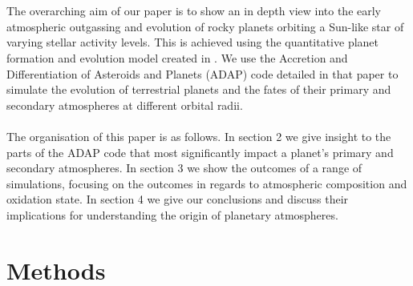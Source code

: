 \documentclass[bibyear,tradiabstract]{aa}
\begin{document}
\\
\\
The overarching aim of our paper is to show an in depth view into the early atmospheric outgassing and evolution of rocky planets orbiting a Sun-like star of varying stellar activity levels. This is achieved using the quantitative planet formation and evolution model created in \citet{Johansen+2023I}. We use the Accretion and Differentiation of Asteroids and Planets (ADAP) code detailed in that paper to simulate the evolution of terrestrial planets and the fates of their primary and secondary atmospheres at different orbital radii.\\
\\
The organisation of this paper is as follows. In section 2 we give insight to the parts of the ADAP code that most significantly impact a planet's primary and secondary atmospheres. In section 3 we show the outcomes of a range of simulations, focusing on the outcomes in regards to atmospheric composition and oxidation state. In section 4 we give our conclusions and discuss their implications for understanding the origin of planetary atmospheres.
   

\section{Methods}
\end{document}
